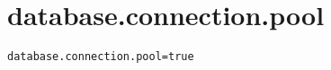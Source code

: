 \section{database.connection.pool}
\label{configuration:DatabaseConnectionPool}
\ClearAPI
\TODO
{}
\begin{lstlisting}[style=Props,caption={Usage example for \textit{database.connection.pool}}]
database.connection.pool=true
\end{lstlisting}